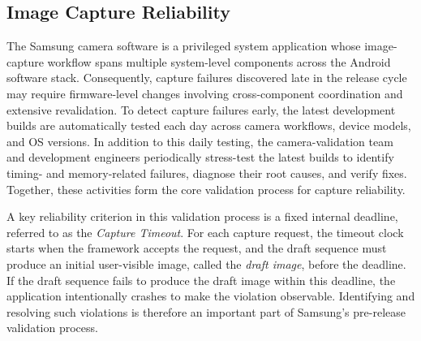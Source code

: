 \subsection{Image Capture Reliability}
\label{sec:release-process}

The Samsung camera software is a privileged system application whose image-capture workflow spans multiple system-level components across the Android software stack.
Consequently, capture failures discovered late in the release cycle may require firmware-level changes involving cross-component coordination and extensive revalidation.
To detect capture failures early, the latest development builds are automatically tested each day across camera workflows, device models, and OS versions.
In addition to this daily testing, the camera-validation team and development engineers periodically stress-test the latest builds to identify timing- and memory-related failures, diagnose their root causes, and verify fixes.
Together, these activities form the core validation process for capture reliability.

A key reliability criterion in this validation process is a fixed internal deadline, referred to as the \emph{Capture Timeout}.
For each capture request, the timeout clock starts when the framework accepts the request, and the draft sequence must produce an initial user-visible image, called the \emph{draft image}, before the deadline.
If the draft sequence fails to produce the draft image within this deadline, the application intentionally crashes to make the violation observable.
Identifying and resolving such violations is therefore an important part of Samsung's pre-release validation process.

